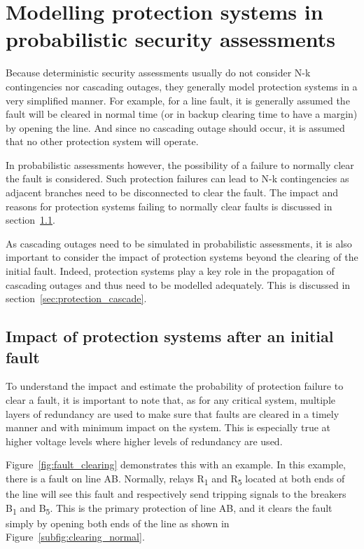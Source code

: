 \section{Modelling protection systems in probabilistic security assessments}
\label{sec:FMEA}

Because deterministic security assessments usually do not consider N-k contingencies nor cascading outages, they generally model protection systems in a very simplified manner. For example, for a line fault, it is generally assumed the fault will be cleared in normal time (or in backup clearing time to have a margin) by opening the line. And since no cascading outage should occur, it is assumed that no other protection system will operate.

In probabilistic assessments however, the possibility of a failure to normally clear the fault is considered. Such protection failures can lead to N-k contingencies as adjacent branches need to be disconnected to clear the fault. The impact and reasons for protection systems failing to normally clear faults is discussed in section~\ref{sec:protection_clearing}.

As cascading outages need to be simulated in probabilistic assessments, it is also important to consider the impact of protection systems beyond the clearing of the initial fault. Indeed, protection systems play a key role in the propagation of cascading outages and thus need to be modelled adequately. This is discussed in section~\ref{sec:protection_cascade}.


\subsection{Impact of protection systems after an initial fault}
\label{sec:protection_clearing}

To understand the impact and estimate the probability of protection failure to clear a fault, it is important to note that, as for any critical system, multiple layers of redundancy are used to make sure that faults are cleared in a timely manner and with minimum impact on the system. This is especially true at higher voltage levels where higher levels of redundancy are used.

Figure~\ref{fig:fault_clearing} demonstrates this with an example. In this example, there is a fault on line AB. Normally, relays R\textsubscript{1} and R\textsubscript{5} located at both ends of the line will see this fault and respectively send tripping signals to the breakers B\textsubscript{1} and B\textsubscript{5}. This is the primary protection of line AB, and it clears the fault simply by opening both ends of the line as shown in Figure~\ref{subfig:clearing_normal}.

